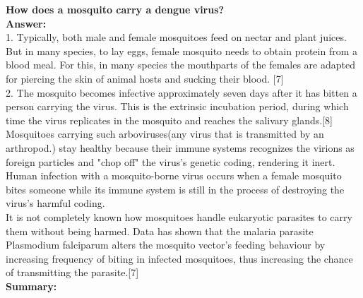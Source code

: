 \documentclass[11pt]{exam}
\begin{document}
\begin{questions}
\question
\label{4. Mosquito: A dengue vector}
\textbf{How does a mosquito carry a dengue virus?} \\
\textbf{Answer:} \\
1. Typically, both male and female mosquitoes feed on nectar and plant juices. But in many species, to lay eggs, female mosquito needs to obtain protein from a blood meal. For this, in many species the mouthparts of the females are adapted for piercing the skin of animal hosts and sucking their blood. [7]\\
2. The mosquito becomes infective approximately seven days after it has bitten a person carrying the virus. This is the extrinsic incubation period, during which time the virus replicates in the mosquito and reaches the salivary glands.[8] \\

Mosquitoes carrying such arboviruses(any virus that is transmitted by an arthropod.) stay healthy because their immune systems recognizes the virions as foreign particles and "chop off" the virus's genetic coding, rendering it inert. Human infection with a mosquito-borne virus occurs when a female mosquito bites someone while its immune system is still in the process of destroying the virus's harmful coding. \\
It is not completely known how mosquitoes handle eukaryotic parasites to carry them without being harmed. Data has shown that the malaria parasite Plasmodium falciparum alters the mosquito vector's feeding behaviour by increasing frequency of biting in infected mosquitoes, thus increasing the chance of transmitting the parasite.[7]\\

\textbf{Summary:} \\
\\ \\


\end{questions}
\end{document}
